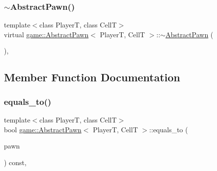 \mbox{\label{classgame_1_1_abstract_pawn_a3fa5336d077fb00b3b3df2bc662e62eb}} 
\subsubsection{\texorpdfstring{$\sim$\+Abstract\+Pawn()}{~AbstractPawn()}}
{\footnotesize\ttfamily template$<$class PlayerT, class CellT$>$ \\
virtual \hyperlink{classgame_1_1_abstract_pawn}{game\+::\+Abstract\+Pawn}$<$ PlayerT, CellT $>$\+::$\sim$\hyperlink{classgame_1_1_abstract_pawn}{Abstract\+Pawn} (\begin{DoxyParamCaption}{ }\end{DoxyParamCaption})\hspace{0.3cm}{\ttfamily [inline]}, {\ttfamily [virtual]}}



\subsection{Member Function Documentation}
\mbox{\label{classgame_1_1_abstract_pawn_aa1911c1f88d6b345a4a004cded7e6904}} 
\subsubsection{\texorpdfstring{equals\+\_\+to()}{equals\_to()}}
{\footnotesize\ttfamily template$<$class PlayerT, class CellT$>$ \\
bool \hyperlink{classgame_1_1_abstract_pawn}{game\+::\+Abstract\+Pawn}$<$ PlayerT, CellT $>$\+::equals\+\_\+to (\begin{DoxyParamCaption}\item[{const \hyperlink{classgame_1_1_abstract_pawn}{Abstract\+Pawn}$<$ PlayerT, CellT $>$ \&}]{pawn }\end{DoxyParamCaption}) const\hspace{0.3cm}{\ttfamily [protected]}, {\ttfamily [virtual]}}


